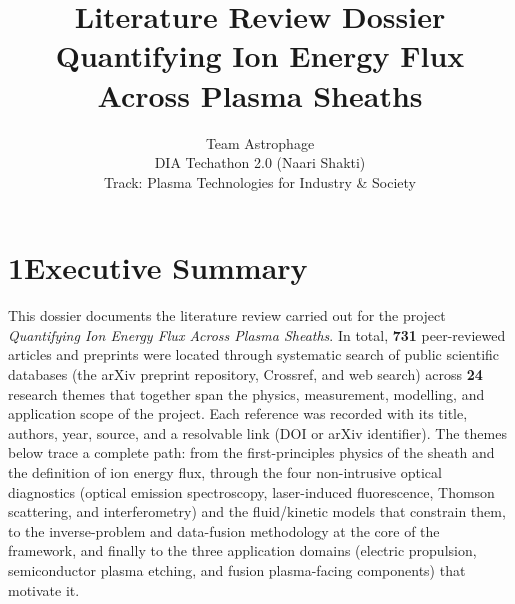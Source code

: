 \documentclass[11pt,a4paper]{article}
\title{\textbf{Literature Review Dossier}\\[2mm]\large Quantifying Ion Energy Flux Across Plasma Sheaths}
\author{Team Astrophage \\ DIA Techathon 2.0 (Naari Shakti) \\ Track: Plasma Technologies for Industry \& Society}
\date{}
\begin{document}
\maketitle
\thispagestyle{empty}

\section*{1\quad Executive Summary}
This dossier documents the literature review carried out for the project \emph{Quantifying Ion Energy Flux Across Plasma Sheaths}. In total, \textbf{731} peer-reviewed articles and preprints were located through systematic search of public scientific databases (the arXiv preprint repository, Crossref, and web search) across \textbf{24} research themes that together span the physics, measurement, modelling, and application scope of the project. Each reference was recorded with its title, authors, year, source, and a resolvable link (DOI or arXiv identifier). The themes below trace a complete path: from the first-principles physics of the sheath and the definition of ion energy flux, through the four non-intrusive optical diagnostics (optical emission spectroscopy, laser-induced fluorescence, Thomson scattering, and interferometry) and the fluid/kinetic models that constrain them, to the inverse-problem and data-fusion methodology at the core of the framework, and finally to the three application domains (electric propulsion, semiconductor plasma etching, and fusion plasma-facing components) that motivate it.
\end{document}
